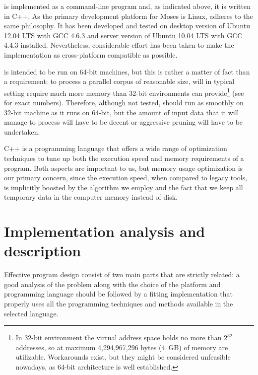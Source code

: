 

\Eppex{} is implemented as a command-line program and, as indicated above, it is written in C++.
As the primary development platform for Moses is Linux,
\eppex{} adheres to the same philosophy.
It has been developed and tested on desktop version of Ubuntu 12.04 LTS with GCC 4.6.3
and server version of Ubuntu 10.04 LTS with GCC 4.4.3 installed. %
Nevertheless, considerable effort has been taken to make the implementation as cross-platform
compatible as possible.

\Eppex{} is intended to be run on 64-bit machines, but this is rather a matter of fact than
a requirement: to process a parallel corpus of reasonable size, \eppex{} will in typical
setting require much more memory than 32-bit environments can provide\footnote{In 32-bit
environment the virtual address space holds no more than $2^{32}$ addresses, so at maximum
4,294,967,296 bytes (4~GB) of memory are utilizable. Workarounds exist, but they might be
considered unfeasible nowadays, as 64-bit architecture is well established.} (see 
for exact numbers).
Therefore, although not tested, \eppex{} should run as smoothly on 32-bit machine as it runs
on 64-bit, but the amount of input data that it will manage to process will have to be decent
or aggressive pruning will have to be undertaken.

C++ is a programming language that offers a wide range of optimization techniques to
tune up both the execution speed and memory requirements of a program.
Both aspects are important to us, but memory usage optimization is our primary concern,
since the execution speed, when compared to legacy tools, is implicitly boosted by the algorithm
we employ and the fact that we keep all temporary data in the computer memory instead of disk.

\section{Implementation analysis and description}

Effective program design consist of two main parts that are strictly related:
a good analysis of the problem along with the choice of the platform and programming language
should be followed by a fitting implementation that properly uses all the programming techniques
and methods available in the selected language.

